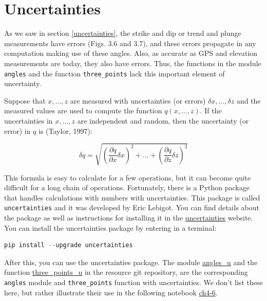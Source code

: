 \documentclass[a4paper , 12pt]{book}
\newcommand{\code}[1]{\colorbox{light-gray}{\texttt{#1}}}
\begin{document}
\section{Uncertainties}\label{calcuncertainties}

As we saw in section \ref{uncertainties}, the strike and dip or trend and plunge measurements have errors (Figs. 3.6 and 3.7), and these errors  propagate in any computation making use of these angles. Also, as accurate as GPS and elevation measurements are today, they also have errors. Thus, the functions in the module \code{angles} and the function \code{three\_points} lack this important element of uncertainty.

Suppose that $x, ..., z$ are measured with uncertainties (or errors) $\delta x, ..., \delta z$ and the measured values are used to compute the function $q(x,...,z)$. If the uncertainties in $x, ..., z$ are independent and random, then the uncertainty (or error) in $q$ is (Taylor, 1997):

\begin{equation}
    \delta q=\sqrt{\left(\frac{\partial q}{\partial x}\delta x \right)^2+...+\left(\frac{\partial q}{\partial z}\delta z \right)^2}\tag{4.16}
\end{equation}

This formula is easy to calculate for a few operations, but it can become quite difficult for a long chain of operations. Fortunately, there is a Python package that handles calculations with numbers with uncertainties. This package is called \code{uncertainties} and it was developed by Eric Lebigot. You can find details about the package as well as instructions for installing it in the \href{https://pythonhosted.org/uncertainties/}{uncertainties} website. You can install the uncertainties package by entering in a terminal:

\begin{center}
\begin{lstlisting}[language=Python, frame=single]
pip install --upgrade uncertainties
\end{lstlisting}
\end{center}

After this, you can use the uncertainties package. The module \href{https://github.com/nfcd/compGeo/blob/master/source/functions/angles_u.py}{angles\_u} and the function  \href{https://github.com/nfcd/compGeo/blob/master/source/functions/three_points_u.py}{three\_points\_u} in the resource git repository, are the corresponding \code{angles} module and \code{three\_points} function with uncertainties. We don't list these here, but rather illustrate their use in the following notebook \href{https://github.com/nfcd/compGeo/blob/master/source/notebooks/ch4-6.ipynb}{ch4-6}.
\end{document}
